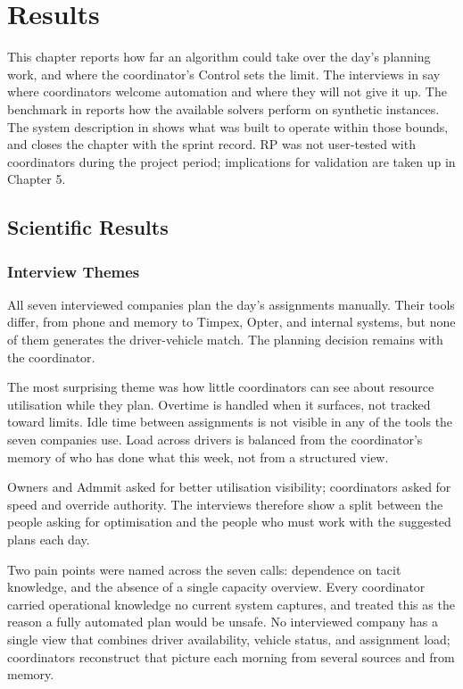 \chapter{Results}
\label{chap:findings}

This chapter reports how far an algorithm could take over the day's planning work, and where the coordinator's Control sets the limit. The interviews in  say where coordinators welcome automation and where they will not give it up. The benchmark in  reports how the available solvers perform on synthetic instances. The system description in  shows what was built to operate within those bounds, and  closes the chapter with the sprint record. RP was not user-tested with coordinators during the project period; implications for validation are taken up in Chapter 5.


\section{Scientific Results}
\label{sec:scientific-results}

\subsection{Interview Themes}
\label{sec:interview-findings}
\label{sec:interview-themes}

All seven interviewed companies plan the day's assignments manually. Their tools differ, from phone and memory to Timpex, Opter, and internal systems, but none of them generates the driver-vehicle match. The planning decision remains with the coordinator.

The most surprising theme was how little coordinators can see about resource utilisation while they plan. Overtime is handled when it surfaces, not tracked toward limits. Idle time between assignments is not visible in any of the tools the seven companies use. Load across drivers is balanced from the coordinator's memory of who has done what this week, not from a structured view.

Owners and Admmit asked for better utilisation visibility; coordinators asked for speed and override authority. The interviews therefore show a split between the people asking for optimisation and the people who must work with the suggested plans each day.

Two pain points were named across the seven calls: dependence on tacit knowledge, and the absence of a single capacity overview. Every coordinator carried operational knowledge no current system captures, and treated this as the reason a fully automated plan would be unsafe. No interviewed company has a single view that combines driver availability, vehicle status, and assignment load; coordinators reconstruct that picture each morning from several sources and from memory.

